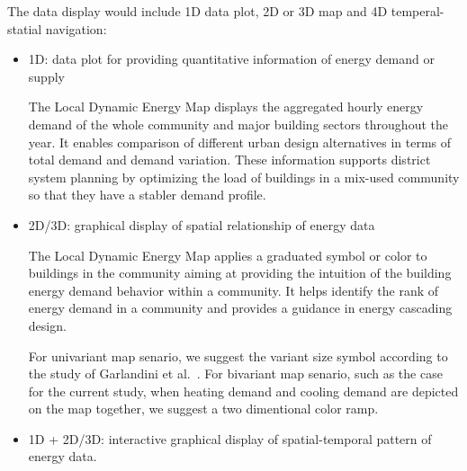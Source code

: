 \documentclass[hidelinks,12pt]{article}
\begin{document}
The data display would include 1D data plot, 2D or 3D map and 4D
temperal-statial navigation:
\begin{itemize}
\item 1D: data plot for providing quantitative information of energy
  demand or supply

  The Local Dynamic Energy Map displays the aggregated hourly energy
  demand of the whole community and major building sectors throughout
  the year. It enables comparison of different urban design
  alternatives in terms of total demand and demand variation. These
  information supports district system planning by optimizing the load
  of buildings in a mix-used community so that they have a stabler
  demand profile.

\item 2D/3D: graphical display of spatial relationship of energy data

  The Local Dynamic Energy Map applies a graduated symbol or color to
  buildings in the community aiming at providing the intuition of the
  building energy demand behavior within a community. It helps
  identify the rank of energy demand in a community and provides a
  guidance in energy cascading design.
    
  For univariant map senario, we suggest the variant size symbol
  according to the study of Garlandini et
  al.~\cite{Garlandini2009}. For bivariant map senario, such as the
  case for the current study, when heating demand and cooling demand
  are depicted on the map together, we suggest a two dimentional color
  ramp.

\item 1D + 2D/3D: interactive graphical display of spatial-temporal
  pattern of energy data.
\end{itemize}
\end{document}
